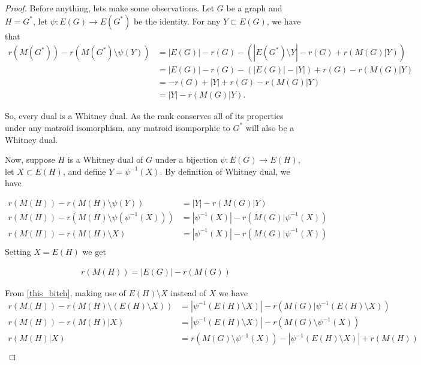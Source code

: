 \begin{proof}
    Before anything, lets make some observations. Let $G$ be a graph and $H = G^*$, let $\psi : E(G) \rightarrow E(G^*)$ be the identity.
    For any $Y \subset E(G)$, we have that
    \begin{align}
            r(M(G^*)) - r(M(G^*)\setminus \psi(Y))  &= |E(G)| - r(G) - (|E(G^*)\setminus Y| - r(G) + r(M(G)|Y))     \\
                                                    &= |E(G)| - r(G) - (|E(G)| - |Y|) + r(G) - r(M(G)|Y)            \\
                                                    &= - r(G) + |Y| + r(G) - r(M(G)|Y)                              \\
                                                    &= |Y| - r(M(G)|Y).
    \end{align}
    
    So, every dual is a Whitney dual. As the rank conserves all of its properties under any matroid isomorphism, any
    matroid isomporphic to $G^*$ will also be a Whitney dual.\pn
    
    Now, suppose $H$ is a Whitney dual of $G$ under a bijection $\psi : E(G) \rightarrow E(H)$, let $X \subset E(H)$, and 
    define $Y = \psi^{-1} (X)$. By definition of Whitney dual, we have
    
        \begin{align}
                r(M(H)) - r(M(H)\setminus \psi(Y)) &= |Y| - r(M(G)|Y) \\ 
                r(M(H)) - r(M(H)\setminus \psi(\psi^{-1} (X))) &= |\psi^{-1} (X)| - r(M(G)|\psi^{-1} (X))\\
                r(M(H)) - r(M(H)\setminus X) &= |\psi^{-1} (X)| - r(M(G)|\psi^{-1} (X)) \label{this_bitch}\\
        \end{align}
    Setting $X =  E(H)$ we get
    
        \begin{align}
                r(M(H)) = |E(G)| - r(M(G)) \label{this_new_bitch}
        \end{align}


    From \eqref{this_bitch}, making use of $E(H) \setminus X$ instead of $X$ we have
    \begin{align}
            r(M(H)) - r(M(H)\setminus (E(H) \setminus X)) &= |\psi^{-1} (E(H) \setminus X)| - r(M(G)|\psi^{-1} (E(H) \setminus X)) \\
            r(M(H)) - r(M(H)|X) &= |\psi^{-1} (E(H) \setminus X)| - r(M(G)\setminus \psi^{-1} ( X)) \\
            r(M(H)|X) &= r(M(G)\setminus \psi^{-1} ( X)) -|\psi^{-1} (E(H) \setminus X)| + r(M(H)) \label{this_third_bitch}\\
    \end{align}
        

\end{proof}
